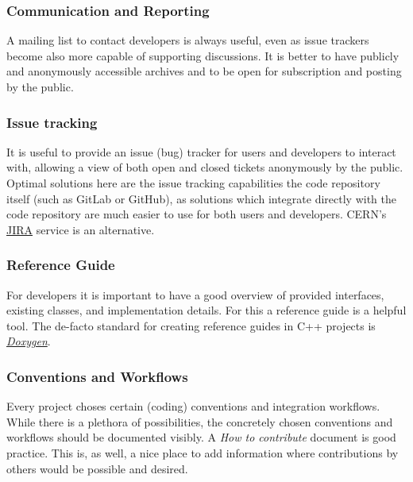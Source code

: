 \documentclass[12pt,a4paper]{article}
\begin{document}
\subsubsection{Communication and
Reporting}\label{communication-and-reporting}

A mailing list to contact developers is always useful, even as issue
trackers become also more capable of supporting discussions. It is
better to have publicly and anonymously accessible archives and to be
open for subscription and posting by the public.

\subsubsection{Issue tracking}\label{issue-tracking}

It is useful to provide an issue (bug) tracker for users and developers
to interact with, allowing a view of both open and closed tickets
anonymously by the public. Optimal solutions here are the issue tracking
capabilities the code repository itself (such as GitLab or GitHub), as
solutions which integrate directly with the code repository are much
easier to use for both users and developers. CERN's
\href{https://www.atlassian.com/software/jira}{JIRA} service is an
alternative.

\subsubsection{Reference Guide}\label{reference-guide}

For developers it is important to have a good overview of provided
interfaces, existing classes, and implementation details. For this a
reference guide is a helpful tool. The de-facto standard for creating
reference guides in C++ projects is
\href{http://www.doxygen.org/}{\emph{Doxygen}}.

\subsubsection{Conventions and
Workflows}\label{conventions-and-workflows}

Every project choses certain (coding) conventions and integration
workflows. While there is a plethora of possibilities, the concretely
chosen conventions and workflows should be documented visibly. A
\emph{How to contribute} document is good practice. This is, as well, a
nice place to add information where contributions by others would be
possible and desired.
\end{document}
